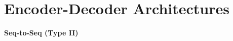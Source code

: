 \section{Encoder-Decoder Architectures}


\begin{frame}


\vspace{15mm}
\hspace{25mm} \textbf{\LARGE{Seq-to-Seq (Type II)}}
\begin{figure}
      \centering
  \end{figure}
  
\end{frame}

